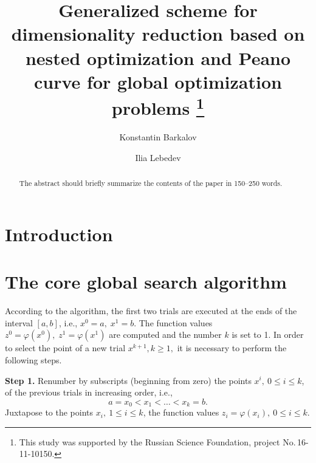 \documentclass[runningheads]{llncs}
\begin{document}
%
\title{ Generalized scheme for dimensionality reduction based on nested 
optimization and Peano curve for global optimization problems
\thanks{This study was supported by the Russian Science Foundation, project 
No.\,16-11-10150.}}
%
%
\author{Konstantin Barkalov  \and
Ilia Lebedev}
%
%
%
\maketitle              %
%
\begin{abstract}
The abstract should briefly summarize the contents of the paper in
150--250 words.

\end{abstract}
%
%
%
\section{Introduction}

\section{The core global search algorithm}

According to the algorithm, the first two trials are executed at the ends of 
the interval  $[a,b]$, i.e., $x^0=a,\;x^1=b$. The function values $z^0=\varphi
(x^0),\;z^1=\varphi(x^1)$  are computed and the number $k$ is set to 1. In 
order to select the point of a new trial $x^{k+1}, k\geq 1,$  it is necessary 
to perform the following steps.

\textbf{Step 1.} Renumber by subscripts (beginning from zero) the points $x^i,
\:0\leq i\leq k$, of the previous trials in increasing order, i.e.,
\begin{displaymath}
a=x_0<x_1<\ldots <x_{k}=b.
\end{displaymath} 
Juxtapose to the points $x_i,\:1\leq i\leq k$,  the function values $z_i=
\varphi(x_i),\:0\leq i\leq k$.
\end{document}

